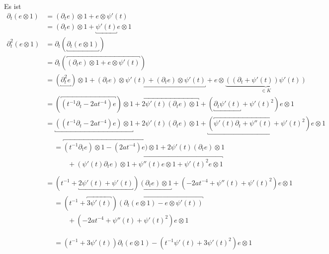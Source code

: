 \begin{try} %
Es ist
\begin{align*}
\partial_t(e\otimes 1) &= (\partial_te)\otimes 1 + e\otimes \psi'(t) \\
  &= (\partial_te)\otimes 1 + \underbracket{\psi'(t)} e\otimes 1 \\
\partial_t^2(e\otimes 1) &= \partial_t(\underbracket{\partial_t(e\otimes 1)})\\
  &= \partial_t(\overbracket{(\partial_te)\otimes 1
    + e\otimes \psi'(t)})\\
  &= (\underbracket{\partial_t^2 e})\otimes 1
    + \underbracket{(\partial_t e)\otimes \psi'(t)
    +               (\partial_t e)\otimes \psi'(t)}
    + e\otimes\underset{\in K}{\underbrace{((\partial_t+\psi'(t))\psi'(t))}}\\
  &= (\overbracket{(t^{-1}\partial_t - 2at^{-4}) e})\otimes 1
    + \overbracket{2\psi'(t) (\partial_t e)\otimes 1}
    + (\underbracket{\partial_t\psi'(t)} + \psi'(t)^2)e\otimes 1\\
  &= \underbracket{((t^{-1}\partial_t - 2at^{-4}) e)\otimes 1}
    + 2\psi'(t) (\partial_t e)\otimes 1
    + \underbracket{(\overbracket{\psi'(t)\partial_t + \psi''(t)} +
    \psi'(t)^2)e\otimes 1}\\
  &\begin{aligned}
    &= \overbracket{
        (t^{-1}\partial_t e)\otimes 1
        - (2at^{-4}) e)\otimes 1
      }
      + 2\psi'(t) (\partial_t e)\otimes 1\\
    &\qquad + \overbracket{
        (\psi'(t)\partial_t e)\otimes 1
        + \psi''(t) e\otimes 1
        + \psi'(t)^2 e\otimes 1
      }\\
  \end{aligned} \\
  &= (t^{-1} + \underbracket{2\psi'(t) + \psi'(t)})
    \underbracket{(\partial_t e)\otimes 1}
    + (- 2at^{-4} + \psi''(t) + \psi'(t)^2) e\otimes 1 \\
  &\begin{aligned}
    &= (t^{-1} + \overbracket{3\psi'(t)})\overbracket{(\partial_t (e\otimes 1)
    - e\otimes \psi'(t))}\\
    &\qquad + (- 2at^{-4} + \psi''(t) + \psi'(t)^2) e\otimes 1 \\
  \end{aligned} \\
  &\begin{aligned}
    &= (t^{-1} + 3\psi'(t))\partial_t (e\otimes 1)
    - (t^{-1} \psi'(t) + 3\psi'(t)^2)e\otimes 1\\

\end{aligned}
\end{align*}
\end{try}
